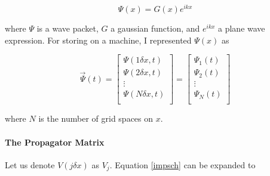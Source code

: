\documentclass[letterpaper,12pt]{article}
\begin{document}
    \vspace{-0.5cm}
    \[
        \Psi(x) = G(x)e^{ikx}
    \]

    where $\Psi$ is a wave packet, $G$ a gaussian function, and $e^{ikx}$ a
    plane wave expression. For storing on a machine, I represented $\Psi(x)$ as

    \vspace{-0.2cm}
    \[
        \vec{\Psi}(t) =
        \begin{bmatrix}
            \Psi(1 \delta x, t) \\
            \Psi(2 \delta x, t) \\
            \vdots \\
            \Psi(N \delta x, t) \\
        \end{bmatrix}
        =
        \begin{bmatrix}
            \Psi_1(t) \\
            \Psi_2(t) \\
            \vdots \\
            \Psi_N(t) \\
        \end{bmatrix}
    \]

    where $N$ is the number of grid spaces on $x$.

    \paragraph{The Propagator Matrix}

    Let us denote $V(j \delta x)$ as $V_j$. Equation \eqref{impsch} can be
    expanded to
\end{document}
